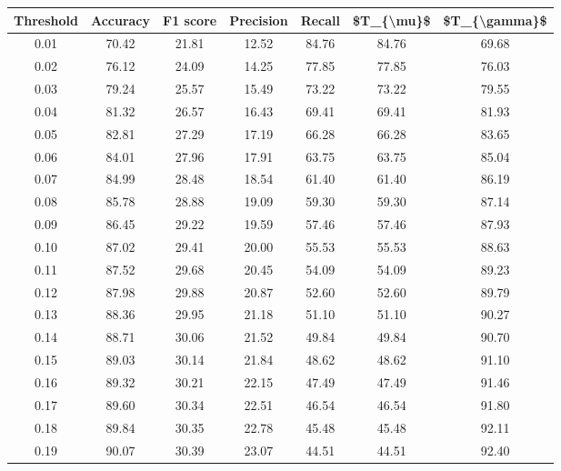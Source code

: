 \begin{tabular}{|c|c|c|c|c|c|c|}
\hline
 Threshold &  Accuracy &  F1 score &  Precision &  Recall &  \$T\_\{\textbackslash mu\}\$ &  \$T\_\{\textbackslash gamma\}\$ \\
\hline
      0.01 &     70.42 &     21.81 &      12.52 &   84.76 &      84.76 &         69.68 \\
      0.02 &     76.12 &     24.09 &      14.25 &   77.85 &      77.85 &         76.03 \\
      0.03 &     79.24 &     25.57 &      15.49 &   73.22 &      73.22 &         79.55 \\
      0.04 &     81.32 &     26.57 &      16.43 &   69.41 &      69.41 &         81.93 \\
      0.05 &     82.81 &     27.29 &      17.19 &   66.28 &      66.28 &         83.65 \\
      0.06 &     84.01 &     27.96 &      17.91 &   63.75 &      63.75 &         85.04 \\
      0.07 &     84.99 &     28.48 &      18.54 &   61.40 &      61.40 &         86.19 \\
      0.08 &     85.78 &     28.88 &      19.09 &   59.30 &      59.30 &         87.14 \\
      0.09 &     86.45 &     29.22 &      19.59 &   57.46 &      57.46 &         87.93 \\
      0.10 &     87.02 &     29.41 &      20.00 &   55.53 &      55.53 &         88.63 \\
      0.11 &     87.52 &     29.68 &      20.45 &   54.09 &      54.09 &         89.23 \\
      0.12 &     87.98 &     29.88 &      20.87 &   52.60 &      52.60 &         89.79 \\
      0.13 &     88.36 &     29.95 &      21.18 &   51.10 &      51.10 &         90.27 \\
      0.14 &     88.71 &     30.06 &      21.52 &   49.84 &      49.84 &         90.70 \\
      0.15 &     89.03 &     30.14 &      21.84 &   48.62 &      48.62 &         91.10 \\
      0.16 &     89.32 &     30.21 &      22.15 &   47.49 &      47.49 &         91.46 \\
      0.17 &     89.60 &     30.34 &      22.51 &   46.54 &      46.54 &         91.80 \\
      0.18 &     89.84 &     30.35 &      22.78 &   45.48 &      45.48 &         92.11 \\
      0.19 &     90.07 &     30.39 &      23.07 &   44.51 &      44.51 &         92.40 \\

\end{tabular}
